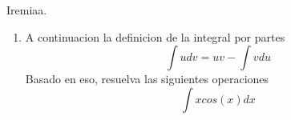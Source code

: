 \documentclass[12pt]{article}%
\begin{document}
%
\normalsize%
\pagestyle{header}%
Iremiaa.%
\begin{enumerate}[wide, labelwidth=!, labelindent=0pt,label={Question \arabic*. }]%
\item%
%
A continuacion la definicion de la integral por partes%
\[\int udv=uv-\int vdu\]%
Basado en eso, resuelva las siguientes operaciones%
%
\[\int xcos(x)dx\]%
\end{enumerate}%
\end{document}
